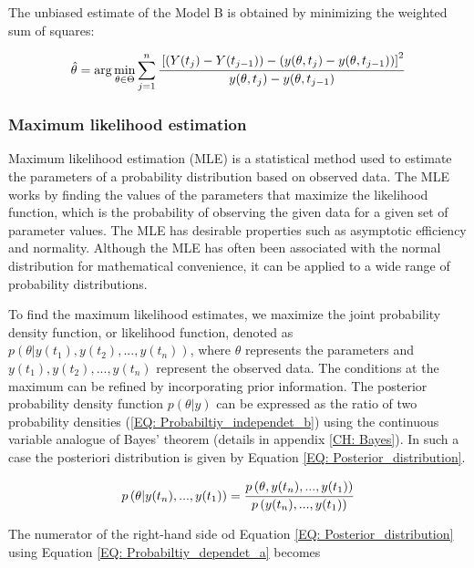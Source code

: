 \documentclass[../Article_Model_Parameters.tex]{subfiles}
\begin{document}
The unbiased estimate of the Model B is obtained by minimizing the weighted sum of squares:

{\footnotesize
	\begin{equation*}
		\hat{\theta} = \arg \min_{\theta \in \Theta} \sum_{j=1}^{n} \cfrac{ \left[ \left( Y(t_j) - Y(t_{j-1}) \right) - \left( y(\theta, t_j) - y(\theta, t_{j-1}) \right) \right]^2  }{y(\theta, t_j) - y(\theta, t_{j-1})}
\end{equation*} }

\fi

\subsubsection{Maximum likelihood estimation}

Maximum likelihood estimation (MLE) is a statistical method used to estimate the parameters of a probability distribution based on observed data. The MLE works by finding the values of the parameters that maximize the likelihood function, which is the probability of observing the given data for a given set of parameter values. The MLE has desirable properties such as asymptotic efficiency and normality. Although the MLE has often been associated with the normal distribution for mathematical convenience, it can be applied to a wide range of probability distributions.

To find the maximum likelihood estimates, we maximize the joint probability density function, or likelihood function, denoted as $p(\theta | y(t_1),y(t_2),...,y(t_n))$, where $\theta$ represents the parameters and $y(t_1),y(t_2),...,y(t_n)$ represent the observed data. The conditions at the maximum can be refined by incorporating prior information. The posterior probability density function $p(\theta|y)$ can be expressed as the ratio of two probability densities (\ref{EQ: Probabiltiy_independet_b}) using the continuous variable analogue of Bayes' theorem (details in appendix \ref{CH: Bayes}). In such a case the posteriori distribution is given by Equation \ref{EQ: Posterior_distribution}.

{\footnotesize
	\begin{align} \label{EQ: Posterior_distribution}
		p\left( \theta| y(t_n),...,y(t_1) \right) = \cfrac{p\left( \theta, y(t_n),...,y(t_1) \right)}{p\left( y(t_n),...,y(t_1) \right)}
\end{align} }

The numerator of the right-hand side od Equation \ref{EQ: Posterior_distribution} using Equation \ref{EQ: Probabiltiy_dependet_a} becomes 
\end{document}

